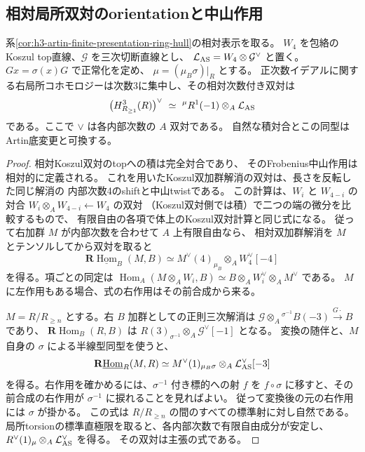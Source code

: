 \subsection{相対局所双対のorientationと中山作用}
\begin{proposition}\label{prop:h3-artin-relative-dualizing-line}
系\ref{cor:h3-artin-finite-presentation-ring-hull}の相対表示を取る。
$W_4$ を包絡のKoszul top直線、$\mathcal G$ を三次切断直線とし、
$\mathcal L_{\rm AS}=W_4\otimes\mathcal G^\vee$ と置く。
$Gx=\sigma(x)G$ で正常化を定め、
$\mu=(\mu_B\sigma)|_R$ とする。
正次数イデアルに関する右局所コホモロジーは次数3に集中し、その相対次数付き双対は
\[
 \bigl(H^3_{R_{\ge1}}(R)\bigr)^\vee
 \ \simeq\ {}^\mu R^1(-1)\otimes_A\mathcal L_{\rm AS}
\]
である。ここで $\vee$ は各内部次数の $A$ 双対である。
自然な積対合とこの同型はArtin底変更と可換する。
\end{proposition}
\begin{proof}
相対Koszul双対のtopへの積は完全対合であり、
そのFrobenius中山作用は相対的に定義される。
これを用いたKoszul双加群解消の双対は、長さを反転した同じ解消の
内部次数4のshiftと中山twistである。
この計算は、$W_i$ と $W_{4-i}$ の対合
$W_i\otimes_A W_{4-i}\leftarrow W_4$ の双対
（Koszul双対側では積）で二つの端の微分を比較するもので、
有限自由の各項で体上のKoszul双対計算と同じ式になる。
従って右加群 $M$ が内部次数を合わせて $A$ 上有限自由なら、
相対双加群解消を $M$ とテンソルしてから双対を取ると
\[
 \mathbf R\underline{\operatorname{Hom}}_B(M,B)
 \simeq M^\vee(4)_{\mu_B}\otimes_A W_4^\vee[-4]
\]
を得る。項ごとの同定は
$\operatorname{Hom}_A(M\otimes_A W_i,B)
 \simeq B\otimes_A W_i^\vee\otimes_A M^\vee$ である。
$M$ に左作用もある場合、式の右作用はその前合成から来る。

$M=R/R_{\ge n}$ とする。右 $B$ 加群としての正則三次解消は
$\mathcal G\otimes_A{}^{\sigma^{-1}}\!B(-3)\xrightarrow{G\cdot}B$ であり、
$\mathbf R\operatorname{Hom}_B(R,B)$ は
$R(3)_{\sigma^{-1}}\otimes_A\mathcal G^\vee[-1]$ となる。
変換の随伴と、$M$ 自身の $\sigma$ による半線型同型を使うと、
\[
 \mathbf R\underline{\operatorname{Hom}}_R(M,R)
 \simeq M^\vee(1)_{\mu_B\sigma}\otimes_A\mathcal L_{\rm AS}^{\vee}[-3]
\]
を得る。右作用を確かめるには、$\sigma^{-1}$ 付き標的への射 $f$ を
$f\circ\sigma$ に移すと、その前合成の右作用が $\sigma^{-1}$ に捩れることを見ればよい。
従って変換後の元の右作用には $\sigma$ が掛かる。
この式は $R/R_{\ge n}$ の間のすべての標準射に対し自然である。
局所torsionの標準直極限を取ると、各内部次数で有限自由成分が安定し、
$R^\vee(1)_{\mu}\otimes_A\mathcal L_{\rm AS}^\vee$ を得る。
その双対は主張の式である。
\end{proof}

